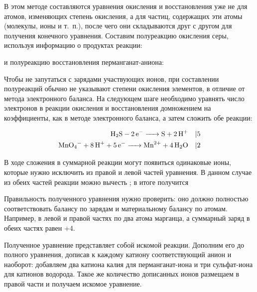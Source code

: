 В этом методе составляются уравнения окисления и восстановления уже не для атомов, изменяющих степень окисления, а для частиц, содержащих эти атомы (молекулы, ионы и т.~п.), после чего они складываются друг с другом для получения конечного уравнения. Составим полуреакцию окисления серы, используя информацию о продуктах реакции:


и полуреакцию восстановления перманганат-аниона:


Чтобы не запутаться с зарядами участвующих ионов, при составлении полуреакций обычно не указывают степени окисления элементов, в отличие от метода электронного баланса. На следующем шаге необходимо уравнять число электронов в реакции окисления и восстановления домножением на коэффициенты, как в методе электронного баланса, а затем сложить обе реакции:

\begin{align*}
    \ce{H2S - 2e- -> S + 2H+} \quad &| 5 \\
    \ce{MnO4^- + 8H+ + 5e- -> Mn^{2+} + 4H2O} \quad &| 2
\end{align*}


В ходе сложения в суммарной реакции могут появиться одинаковые ионы, которые нужно исключить из правой и левой частей уравнения. В данном случае из обеих частей реакции можно вычесть ; в итоге получится


Правильность полученного уравнения нужно проверить: оно должно полностью соответствовать балансу по зарядам и материальному балансу по атомам. Например, в левой и правой частях по два атома марганца, а суммарный заряд в обеих частях равен +4.

Полученное уравнение представляет собой  искомой реакции. Дополним его до полного уравнения, дописав к каждому катиону соответствующий анион и наоборот: добавляем два катиона калия для перманганат-иона и три сульфат-иона для катионов водорода. Такое же количество дописанных ионов размещаем в правой части и получаем искомое уравнение.


